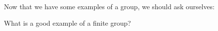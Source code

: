 \documentclass{ximera}
\begin{document}
Now that we have some examples of a group, we should ask ourselves:

\begin{question}
  What is a good example of a finite group?
\end{question}






\end{document}
